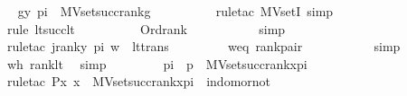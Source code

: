 \begin{isabellebody}
\ \isamarkupfalse%
\ {\isachardoublequoteopen}g{\isacharbackquote}{\kern0pt}{\isacharless}{\kern0pt}y{\isacharcomma}{\kern0pt}\ pi{\isachargreater}{\kern0pt}\ {\isasymin}\ MVset{\isacharparenleft}{\kern0pt}succ{\isacharparenleft}{\kern0pt}rank{\isacharparenleft}{\kern0pt}g{\isacharparenright}{\kern0pt}{\isacharparenright}{\kern0pt}{\isacharparenright}{\kern0pt}{\isachardoublequoteclose}\ \isanewline
\ \ \ \ \ \ \ \isamarkupfalse%
\ {\isacharparenleft}{\kern0pt}rule{\isacharunderscore}{\kern0pt}tac\ MVsetI{\isacharsemicolon}{\kern0pt}\ simp{\isacharparenright}{\kern0pt}\ \isanewline
\ \ \ \ \ \ \ \isamarkupfalse%
\ {\isacharparenleft}{\kern0pt}rule\ lt{\isacharunderscore}{\kern0pt}succ{\isacharunderscore}{\kern0pt}lt{\isacharparenright}{\kern0pt}\ \isanewline
\ \ \ \ \ \ \ \isamarkupfalse%
\ Ord{\isacharunderscore}{\kern0pt}rank\ \isanewline
\ \ \ \ \ \ \ \ \isamarkupfalse%
\ simp\ \isanewline
\ \ \ \ \ \ \ \isamarkupfalse%
\ {\isacharparenleft}{\kern0pt}rule{\isacharunderscore}{\kern0pt}tac\ j{\isacharequal}{\kern0pt}{\isachardoublequoteopen}rank{\isacharparenleft}{\kern0pt}{\isacharless}{\kern0pt}{\isacharless}{\kern0pt}y{\isacharcomma}{\kern0pt}\ pi{\isachargreater}{\kern0pt}{\isacharcomma}{\kern0pt}\ w{\isachargreater}{\kern0pt}{\isacharparenright}{\kern0pt}{\isachardoublequoteclose}\ \ lt{\isacharunderscore}{\kern0pt}trans{\isacharparenright}{\kern0pt}\isanewline
\ \ \ \ \ \ \ \isamarkupfalse%
\ weq\ rank{\isacharunderscore}{\kern0pt}pair{}\ \isanewline
\ \ \ \ \ \ \ \ \isamarkupfalse%
\ simp\isanewline
\ \ \ \ \ \ \ \isamarkupfalse%
\ wh\ rank{\isacharunderscore}{\kern0pt}lt\ \isamarkupfalse%
\ simp\isanewline
\ \ \ \isamarkupfalse%
\isanewline
\isanewline
\ \ \ \isamarkupfalse%
\ {\isachardoublequoteopen}pi\ {\isacharbackquote}{\kern0pt}\ p\ {\isasymin}\ MVset{\isacharparenleft}{\kern0pt}succ{\isacharparenleft}{\kern0pt}rank{\isacharparenleft}{\kern0pt}x{\isacharunderscore}{\kern0pt}pi{\isacharparenright}{\kern0pt}{\isacharparenright}{\kern0pt}{\isacharparenright}{\kern0pt}{\isachardoublequoteclose}\ \isanewline
\ \ \ \ \ \isamarkupfalse%
\ {\isacharparenleft}{\kern0pt}rule{\isacharunderscore}{\kern0pt}tac\ P{\isacharequal}{\kern0pt}{\isachardoublequoteopen}{\isasymlambda}x{\isachardot}{\kern0pt}\ x\ {\isasymin}\ MVset{\isacharparenleft}{\kern0pt}succ{\isacharparenleft}{\kern0pt}rank{\isacharparenleft}{\kern0pt}x{\isacharunderscore}{\kern0pt}pi{\isacharparenright}{\kern0pt}{\isacharparenright}{\kern0pt}{\isacharparenright}{\kern0pt}{\isachardoublequoteclose}\ \ in{\isacharunderscore}{\kern0pt}dom{\isacharunderscore}{\kern0pt}or{\isacharunderscore}{\kern0pt}not{\isacharparenright}{\kern0pt}\ \isanewline

\end{isabellebody}
